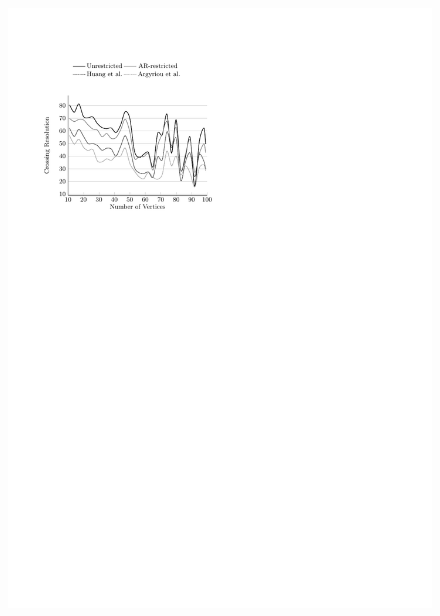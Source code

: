 \documentclass{comjnl}
\begin{document}
\begin{figure}[t!]
{	\includegraphics[scale=0.99,page=2]{figures/north}}
	

\end{figure}
\end{document}
